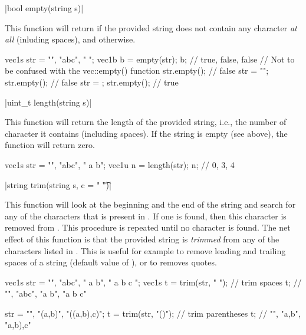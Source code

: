 \item \vectorfunc \cppinline|bool empty(string s)| 

This function will return \cpptrue if the provided string does not contain any character \emph{at all} (inluding spaces), and \cppfalse otherwise.

\begin{example}
\begin{cppcode}
vec1s str = {"", "abc", "   "};
vec1b b = empty(str);
b; // {true, false, false}
// Not to be confused with the vec::empty() function
str.empty(); // false
str = {""};
str.empty(); // false
str = {};
str.empty(); // true
\end{cppcode}
\end{example}

\item \vectorfunc \cppinline|uint_t length(string s)| 

This function will return the length of the provided string, i.e., the number of character it contains (including spaces). If the string is empty (see above), the function will return zero.

\begin{example}
\begin{cppcode}
vec1s str = {"", "abc", " a b"};
vec1u n = length(str);
n; // {0, 3, 4}
\end{cppcode}
\end{example}

\item \vectorfunc \cppinline|string trim(string s, c = " \t")| 

This function will look at the beginning and the end of the string  and search for any of the characters that is present in . If one is found, then this character is removed from . This procedure is repeated until no character is found. The net effect of this function is that the provided string  is \emph{trimmed} from any of the characters listed in . This is useful for example to remove leading and trailing spaces of a string (default value of ), or to removes quotes.

\begin{example}
\begin{cppcode}
vec1s str = {"", "abc", " a b", " a b c  "};
vec1s t = trim(str, " "); // trim spaces
t; // {"", "abc", "a b", "a b c"}

str = {"", "(a,b)", "((a,b),c)"};
t = trim(str, "()"); // trim parentheses
t; // {"", "a,b", "a,b),c"}
\end{cppcode}
\end{example}


